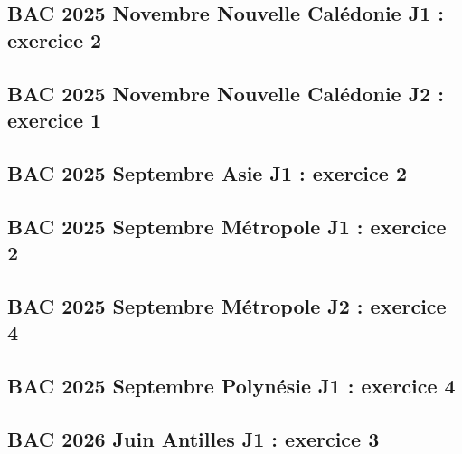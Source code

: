 \documentclass[lang=fr,edition=teacher,layout=sheet]{mxbook}
\begin{document}
\begingroup\endgroup
\par\bigskip
{}\subsection*{BAC 2025 Novembre Nouvelle Calédonie J1 : exercice 2}
\begingroup\endgroup
\par\bigskip
{}\subsection*{BAC 2025 Novembre Nouvelle Calédonie J2 : exercice 1}
\begingroup\endgroup
\par\bigskip
{}\subsection*{BAC 2025 Septembre Asie J1 : exercice 2}
\begingroup\endgroup
\par\bigskip
{}\subsection*{BAC 2025 Septembre Métropole J1 : exercice 2}
\begingroup\endgroup
\par\bigskip
{}\subsection*{BAC 2025 Septembre Métropole J2 : exercice 4}
\begingroup\endgroup
\par\bigskip
{}\subsection*{BAC 2025 Septembre Polynésie J1 : exercice 4}
\begingroup\endgroup
\par\bigskip
{}\subsection*{BAC 2026 Juin Antilles J1 : exercice 3}
\end{document}
